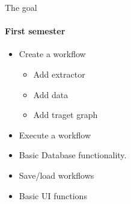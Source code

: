 \begin{frame}{The goal}
\framesubtitle{First semester}
	\begin{itemize}
		\item Create a workflow
		\begin{itemize}
			\item Add extractor
			\item Add data
			\item Add traget graph
		\end{itemize}
		\item Execute a workflow
		\item Basic Database functionality.
		\item Save/load workflows
		\item Basic UI functions
	\end{itemize}
\end{frame}